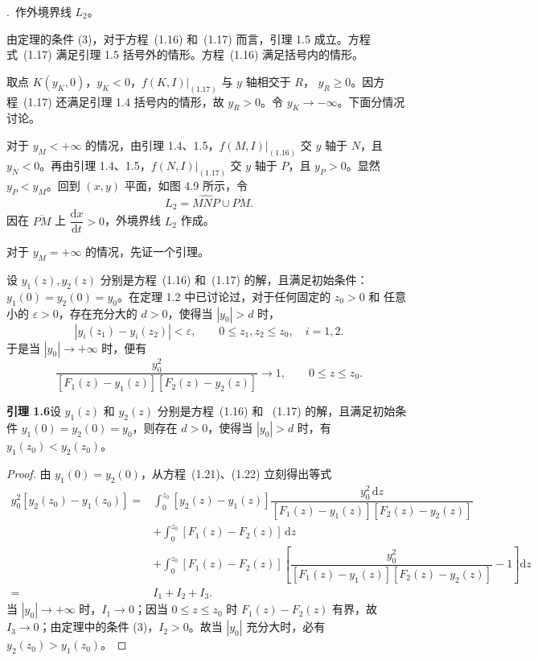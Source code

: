 .~作外境界线 $L_2$。

由定理的条件 (3)，对于方程~(1.16) 和~(1.17) 而言，引理 1.5 成立。方程
式~(1.17) 满足引理 1.5 括号外的情形。方程~(1.16) 满足括号内的情形。

取点 $K(y_K,0)$，$y_K<0$，$f(K,I)|_{(1.17)}$ 与 $y$ 轴相交于 $R$，
$y_R\geq0$。因方程~(1.17) 还满足引理 1.4 括号内的情形，故 $y_R>0$。令
$y_K\to-\infty$。下面分情况讨论。

对于 $y_M<+\infty$ 的情况，由引理 1.4、1.5，$f(M,I)|_{(1.16)}$ 交 $y$ 轴于
$N$，且 $y_N<0$。再由引理 1.4、1.5，$f(N,I)|_{(1.17)}$ 交 $y$ 轴于 $P$，且
$y_P>0$。显然 $y_P<y_M$。回到 $(x,y)$ 平面，如图 4.9 所示，令
\[
  L_2=\widehat{MNP}\cup\overline{PM}.
\]
因在 $\overline{PM}$ 上 $\dfrac{\mathrm{d}x}{\mathrm{d}t}>0$，外境界线 $L_2$
作成。


对于 $y_M=+\infty$ 的情况，先证一个引理。

设 $y_1(z),y_2(z)$ 分别是方程~(1.16) 和~(1.17) 的解，且满足初始条件：
$y_1(0)=y_2(0)=y_0$。在定理 1.2 中已讨论过，对于任何固定的 $z_0>0$ 和
任意小的 $\varepsilon>0$，存在充分大的 $d>0$，使得当 $|y_0|>d$ 时，
\[
  |y_i(z_1)-y_i(z_2)|<\varepsilon,
  \qquad0\leq z_1,z_2\leq z_0,\quad i=1,2. \tag{1.23}
\]
于是当 $|y_0|\to+\infty$ 时，便有
\[
  \dfrac{y_0^2}{[F_1(z)-y_1(z)][F_2(z)-y_2(z)]}\longrightarrow1,
  \qquad0\leq z\leq z_0.
\]

\noindent\textbf{引理 1.6}\quad 设 $y_1(z)$ 和 $y_2(z)$ 分别是方程~(1.16) 和
~(1.17) 的解，且满足初始条件 $y_1(0)=y_2(0)=y_0$，则存在 $d>0$，使得当
$|y_0|>d$ 时，有 $y_1(z_0)<y_2(z_0)$。

\begin{proof}
由 $y_1(0)=y_2(0)$，从方程~(1.21)、(1.22) 立刻得出等式
\[
\begin{aligned}
y_0^2[y_2(z_0)-y_1(z_0)]
={}&\int_0^{z_0}[y_2(z)-y_1(z)]
\dfrac{y_0^2\,\mathrm{d}z}
{[F_1(z)-y_1(z)][F_2(z)-y_2(z)]}\\
&+\int_0^{z_0}[F_1(z)-F_2(z)]\,\mathrm{d}z\\
&+\int_0^{z_0}[F_1(z)-F_2(z)]
\left[\dfrac{y_0^2}{[F_1(z)-y_1(z)][F_2(z)-y_2(z)]}-1\right]\mathrm{d}z\\
={}&I_1+I_2+I_3.
\end{aligned}
\]
当 $|y_0|\to+\infty$ 时，$I_1\to0$；因当 $0\leq z\leq z_0$ 时
$F_1(z)-F_2(z)$ 有界，故 $I_3\to0$；由定理中的条件 (3)，$I_2>0$。故当
$|y_0|$ 充分大时，必有 $y_2(z_0)>y_1(z_0)$。
\end{proof}

